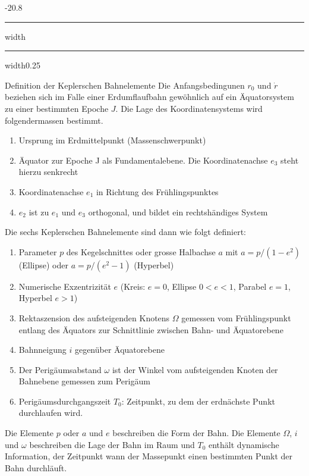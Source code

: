 \documentclass[8pt, landscape, fleqn]{scrartcl}
\makeatletter
\renewcommand{\subsection}{\@startsection{subsection}{1}{0mm}%
{-2\baselineskip}{0.8\baselineskip}%
{\hrule depth 0.2pt width\columnwidth\hrule depth0.75pt
width0.25\columnwidth\vspace*{1.2em}\large\bfseries\rmfamily}}
\makeatother
\begin{document}
\begin{multicols*}{3}
\subsection{Definition der Keplerschen Bahnelemente}
Die Anfangsbedingunen $r_0$ und $\dot{r}$ beziehen sich im Falle einer Erdumflaufbahn gewöhnlich auf ein Äquatorsystem zu einer bestimmten Epoche $J$. Die Lage des Koordinatensystems wird folgendermassen bestimmt.
\begin{enumerate}
    \item Ursprung im Erdmittelpunkt (Massenschwerpunkt)
    \item Äquator zur Epoche J als Fundamentalebene. Die Koordinatenachse $e_3$ steht hierzu senkrecht
    \item Koordinatenachse $e_1$ in Richtung des Frühlingspunktes
    \item $e_2$ ist zu $e_1$ und $e_3$ orthogonal, und bildet ein rechtshändiges System
\end{enumerate}
Die sechs Keplerschen Bahnelemente sind dann wie folgt definiert:
\begin{enumerate}
    \item Parameter $p$ des Kegelschnittes oder grosse Halbachse $a$ mit $a = p/(1-e^2)$ (Ellipse) oder $a = p/(e^2-1)$ (Hyperbel)
    \item Numerische Exzentrizität $e$ (Kreis: $e=0$, Ellipse $0 < e < 1$, Parabel $e=1$, Hyperbel $e>1$) 
    \item Rektaszension des aufsteigenden Knotens $\Omega$ gemessen vom Frühlingspunkt entlang des Äquators zur Schnittlinie zwischen Bahn- und Äquatorebene
    \item Bahnneigung $i$ gegenüber Äquatorebene
    \item Der Perigäumsabstand $\omega$ ist der Winkel vom aufsteigenden Knoten der Bahnebene gemessen zum Perigäum
    \item Perigäumsdurchgangszeit $T_0$: Zeitpunkt, zu dem der erdnächste Punkt durchlaufen wird.
\end{enumerate}
Die Elemente $p$ oder $a$ und $e$ beschreiben die Form der Bahn. Die Elemente $\Omega$, $i$ und $\omega$ beschreiben die Lage der Bahn im Raum und $T_0$ enthält dynamische Information, der Zeitpunkt wann der Massepunkt einen bestimmten Punkt der Bahn durchläuft.

\end{multicols*}
\end{document}

